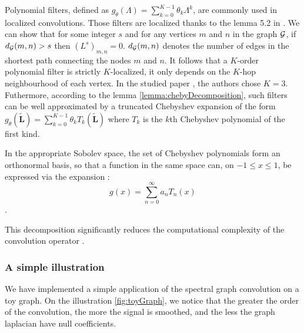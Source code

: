 Polynomial filters, defined as $g_\theta(\Lambda) = \sum_{k=0}^{K-1}\theta_k\Lambda^k$, are commonly used in localized convolutions. Those filters are localized thanks to the lemma 5.2 in \cite{hammond_wavelets_2011}. We can show that for some integer $s$ and for any 
vertices $m$ and $n$ in the graph $\mathcal{G}$, if $d_{\mathcal{G}}(m, n) > s$ then $(L^s)_{m, n} = 0$. $d_{\mathcal{G}}(m, n)$ denotes the number of edges in the shortest path connecting the nodes $m$ and $n$.
It follows that a $K$-order polynomial filter is strictly $K$-localized, \ie it only depends on the $K$-hop neighbourhood of each vertex. In the studied paper \cite{Parisot17}, the authors chose $K=3$.\\ 
Futhermore, according to the lemma \ref{lemma:chebyDecomposition}, such filters can be well approximated by a truncated Chebyshev expansion of the form $g_\theta(\widetilde{\mathbf{L}}) = \sum_{k=0}^{K-1}\theta_kT_k(\widetilde{\mathbf{L}})$ where $T_k$ is the $k$th Chebyshev polynomial of the first kind.
\begin{lemma}\label{lemma:chebyDecomposition}
    In the appropriate Sobolev space, the set of Chebyshev polynomials form an orthonormal basis, so that a function in the same space can, on $-1\leq x \leq 1$, be expressed via the expansion : $$g(x) = \sum_{n=0}^{\infty} a_nT_n(x)$$.
\end{lemma}
This decomposition significantly reduces the computational complexity of the convolution operator \cite{Parisot17}.


\subsubsection{A simple illustration}

We have implemented a simple application of the spectral graph convolution on a toy graph. 
On the illustration \ref{fig:toyGraph}, we notice that the greater the order of the convolution,  the more the signal is smoothed, and the less the graph laplacian have null coefficients.

